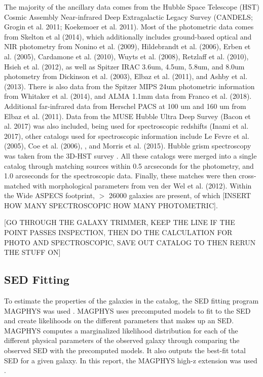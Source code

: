 The majority of the ancillary data comes from the Hubble Space Telescope (HST) Cosmic Assembly Near-infrared Deep Extragalactic Legacy Survey (CANDELS; Grogin et al. 2011; Koekemoer et al. 2011). Most of the photometric data comes from Skelton et al (2014), which additionally includes ground-based optical and NIR photometry from Nonino et al. (2009), Hildebrandt et al. (2006), Erben et al. (2005), Cardamone et al. (2010), Wuyts et al. (2008), Retzlaff et al. (2010), Hsieh et al. (2012), as well as Spitzer IRAC 3.6um, 4.5um, 5.8um, and 8.0um photometry from Dickinson et al. (2003), Elbaz et al. (2011), and Ashby et al. (2013). There is also data from the Spitzer MIPS 24um photometric information from Whitaker et al. (2014), and ALMA 1.1mm data from Franco et al. (2018). Additional far-infrared data from Herschel PACS at 100 um and 160 um from Elbaz et al. (2011). Data from the MUSE Hubble Ultra Deep Survey (Bacon et al. 2017) was also included, being used for spectroscopic redshifts (Inami et al. 2017), other catalogs used for spectroscopic information include Le Fevre et al. (2005), Coe et al. (2006), \cite{skelton20143d}, and Morris et al. (2015). Hubble grism spectroscopy was taken from the 3D-HST survey \cite{momcheva20163d}.  All these catalogs were merged into a single catalog through matching sources within 0.5 arcseconds for the photometry, and 1.0 arcseconds for the spectroscopic data. Finally, these matches were then cross-matched with morphological parameters from ven der Wel et al. (2012). Within the Wide ASPECS footprint, $>$ 26000 galaxies are present, of which [INSERT HOW MANY SPECTROSCOPIC HOW MANY PHOTOMETRIC].

[GO THROUGH THE GALAXY TRIMMER, KEEP THE LINE IF THE POINT PASSES INSPECTION, THEN DO THE CALCULATION FOR PHOTO AND SPECTROSCOPIC, SAVE OUT CATALOG TO THEN RERUN THE STUFF ON]

\subsection{SED Fitting}

To estimate the properties of the galaxies in the catalog, the SED fitting program MAGPHYS was used \cite{da2008simple, da2015alma}. MAGPHYS uses precomputed models to fit to the SED and create likelihoods on the different parameters that makes up an SED. MAGPHYS computes a marginalized likelihood distribution for each of the different physical parameters of the observed galaxy through comparing the observed SED with the precomputed models. It also outputs the best-fit total SED for a given galaxy. In this report, the MAGPHYS high-z extension was used \cite{da2015alma}.

